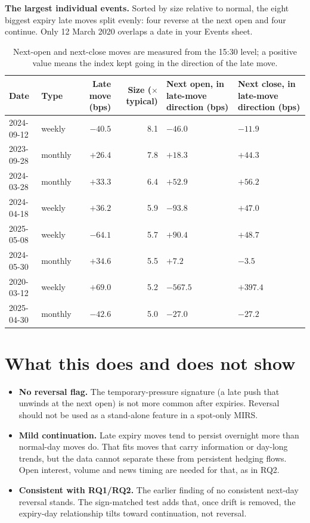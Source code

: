 \documentclass[10pt,a4paper]{article}
\begin{document}
\textbf{The largest individual events.} Sorted by size relative to normal, the eight biggest expiry late moves split evenly: four reverse at the next open and four continue. Only 12 March 2020 overlaps a date in your Events sheet.
\begin{table}[h!]\centering\small
\begin{tabular}{llrrp{3.3cm}p{3.3cm}}
\toprule
Date & Type & Late move (bps) & Size ($\times$ typical) & Next open, in late-move direction (bps) & Next close, in late-move direction (bps)\\
\midrule
2024-09-12 & weekly & $-40.5$ & 8.1 & $-46.0$ & $-11.9$\\
2023-09-28 & monthly & $+26.4$ & 7.8 & $+18.3$ & $+44.3$\\
2024-03-28 & monthly & $+33.3$ & 6.4 & $+52.9$ & $+56.2$\\
2024-04-18 & weekly & $+36.2$ & 5.9 & $-93.8$ & $+47.0$\\
2025-05-08 & weekly & $-64.1$ & 5.7 & $+90.4$ & $+48.7$\\
2024-05-30 & monthly & $+34.6$ & 5.5 & $+7.2$ & $-3.5$\\
2020-03-12 & weekly & $+69.0$ & 5.2 & $-567.5$ & $+397.4$\\
2025-04-30 & monthly & $-42.6$ & 5.0 & $-27.0$ & $-27.2$\\
\bottomrule
\end{tabular}
\caption{Next-open and next-close moves are measured from the 15:30 level; a positive value means the index kept going in the direction of the late move.}
\end{table}

\section*{What this does and does not show}
\begin{itemize}
\item \textbf{No reversal flag.} The temporary-pressure signature (a late push that unwinds at the next open) is not more common after expiries. Reversal should not be used as a stand-alone feature in a spot-only MIRS.
\item \textbf{Mild continuation.} Late expiry moves tend to persist overnight more than normal-day moves do. That fits moves that carry information or day-long trends, but the data cannot separate these from persistent hedging flows. Open interest, volume and news timing are needed for that, as in RQ2.
\item \textbf{Consistent with RQ1/RQ2.} The earlier finding of no consistent next-day reversal stands. The sign-matched test adds that, once drift is removed, the expiry-day relationship tilts toward continuation, not reversal.
\end{itemize}
\end{document}
